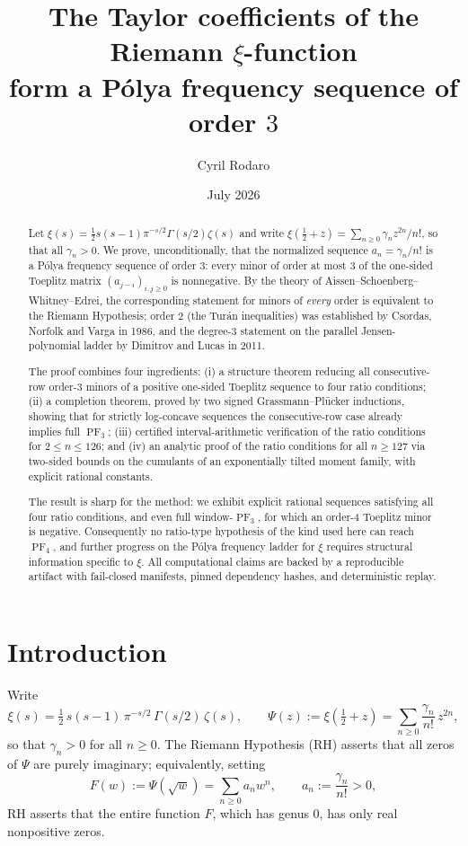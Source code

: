 \documentclass[11pt]{amsart}
\title[The $\xi$ coefficients form a $\PF_3$ sequence]{The Taylor coefficients of the Riemann $\xi$-function\\ form a P\'olya frequency sequence of order $3$}
\author{Cyril Rodaro}
\date{July 2026}
\theoremstyle{definition}
\theoremstyle{remark}
\DeclareMathOperator{\PF}{PF}
\begin{document}
\begin{abstract}
Let $\xi(s)=\tfrac12 s(s-1)\pi^{-s/2}\Gamma(s/2)\zeta(s)$ and write
$\xi(\tfrac12+z)=\sum_{n\ge 0}\gamma_n z^{2n}/n!$, so that all
$\gamma_n>0$. We prove, unconditionally, that the normalized sequence
$a_n=\gamma_n/n!$ is a P\'olya frequency sequence of order $3$: every
minor of order at most $3$ of the one-sided Toeplitz matrix
$(a_{j-i})_{i,j\ge 0}$ is nonnegative. By the theory of
Aissen--Schoenberg--Whitney--Edrei, the corresponding statement for
minors of \emph{every} order is equivalent to the Riemann Hypothesis;
order $2$ (the Tur\'an inequalities) was established by Csordas,
Norfolk and Varga in 1986, and the degree-$3$ statement on the parallel
Jensen-polynomial ladder by Dimitrov and Lucas in 2011.

The proof combines four ingredients: (i) a structure theorem reducing
all consecutive-row order-$3$ minors of a positive one-sided Toeplitz
sequence to four ratio conditions; (ii) a completion theorem, proved by
two signed Grassmann--Pl\"ucker inductions, showing that for strictly
log-concave sequences the consecutive-row case already implies full
$\PF_3$; (iii) certified interval-arithmetic verification of the ratio
conditions for $2\le n\le 126$; and (iv) an analytic proof of the ratio
conditions for all $n\ge 127$ via two-sided bounds on the cumulants of
an exponentially tilted moment family, with explicit rational
constants.

The result is sharp for the method: we exhibit explicit rational
sequences satisfying all four ratio conditions, and even full
window-$\PF_3$, for which an order-$4$ Toeplitz minor is negative.
Consequently no ratio-type hypothesis of the kind used here can reach
$\PF_4$, and further progress on the P\'olya frequency ladder for $\xi$
requires structural information specific to $\xi$. All computational
claims are backed by a reproducible artifact with fail-closed
manifests, pinned dependency hashes, and deterministic replay.
\end{abstract}

\maketitle

\section{Introduction}\label{sec:intro}

Write
\begin{equation}\label{eq:xi}
\xi(s)=\tfrac12\,s(s-1)\,\pi^{-s/2}\,\Gamma(s/2)\,\zeta(s),
\qquad
\Psi(z):=\xi(\tfrac12+z)=\sum_{n\ge 0}\frac{\gamma_n}{n!}\,z^{2n},
\end{equation}
so that $\gamma_n>0$ for all $n\ge 0$. The Riemann Hypothesis (RH)
asserts that all zeros of $\Psi$ are purely imaginary; equivalently,
setting
\begin{equation}\label{eq:F}
F(w):=\Psi(\sqrt{w})=\sum_{n\ge 0}a_n w^{n},
\qquad a_n:=\frac{\gamma_n}{n!}>0,
\end{equation}
RH asserts that the entire function $F$, which has genus $0$, has only
real nonpositive zeros.
\end{document}
